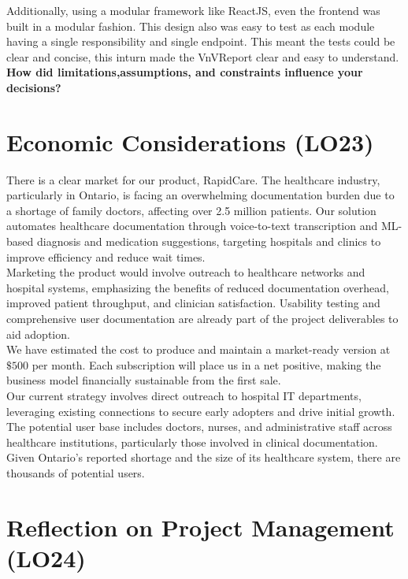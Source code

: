\documentclass{article}
\begin{document}
Additionally, using a modular framework like ReactJS, even the frontend was built in a modular fashion. This design also was easy to test as each module having a single responsibility and single endpoint. This meant the tests could be clear and concise, this inturn made the VnVReport clear and easy to understand.\\


\textbf{How did limitations,assumptions, and constraints influence your decisions?}


 \section{Economic Considerations (LO23)}

 There is a clear market for our product, RapidCare. The healthcare industry, particularly in Ontario, is facing an overwhelming documentation burden due to a shortage of family doctors, affecting over 2.5 million patients. Our solution automates healthcare documentation through voice-to-text transcription and ML-based diagnosis and medication suggestions, targeting hospitals and clinics to improve efficiency and reduce wait times. \\
 
 
 \noindent
 Marketing the product would involve outreach to healthcare networks and hospital systems, emphasizing the benefits of reduced documentation overhead, improved patient throughput, and clinician satisfaction. Usability testing and comprehensive user documentation are already part of the project deliverables to aid adoption. \\
 
 
 \noindent
 We have estimated the cost to produce and maintain a market-ready version at $\$500$ per month. Each subscription will place us in a net positive, making the business model financially sustainable from the first sale. \\
 
 \noindent
 Our current strategy involves direct outreach to hospital IT departments, leveraging existing connections to secure early adopters and drive initial growth. The potential user base includes doctors, nurses, and administrative staff across healthcare institutions, particularly those involved in clinical documentation. Given Ontario’s reported shortage and the size of its healthcare system, there are thousands of potential users.
 
 \section{Reflection on Project Management (LO24)}
 
\end{document}
